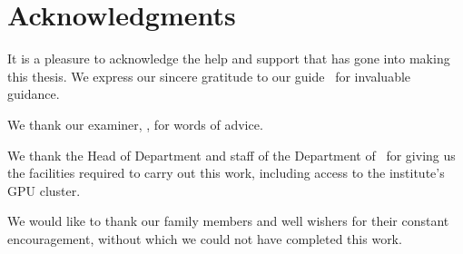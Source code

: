 \chapter*{Acknowledgments}
\thispagestyle{empty}
It is a pleasure to acknowledge the help and support that has gone into making this thesis. We express our sincere gratitude to our guide \GuideName\ for invaluable guidance.\par

We thank our examiner, \ExaminerName, for words of advice.\par

We thank the Head of Department and staff of the Department of \DegreeBranch\ for giving us the facilities required to carry out this work, including access to the institute's GPU cluster.\par

We would like to thank our family members and well wishers for their constant encouragement, without which we could not have completed this work.
